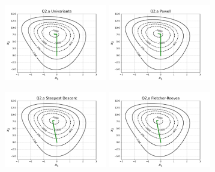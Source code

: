 \documentclass[10pt, a4paper]{article}
\begin{document}
\begin{figure}[H]
  \centering
  \begin{subfigure}[b]{\textwidth}
    \includegraphics[width=0.49\textwidth]{figuras/Q2.a_Univariante_P0=[0.01e-0.1].pdf}
    \includegraphics[width=0.49\textwidth]{figuras/Q2.a_Powell_P0=[0.01e-0.1].pdf}
  \end{subfigure}
  \begin{subfigure}[b]{\textwidth}
    \includegraphics[width=0.49\textwidth]{figuras/Q2.a_Steepest Descent_P0=[0.01e-0.1].pdf}
    \includegraphics[width=0.49\textwidth]{figuras/Q2.a_Fletcher-Reeves_P0=[0.01e-0.1].pdf}

\end{subfigure}
\end{figure}
\end{document}
